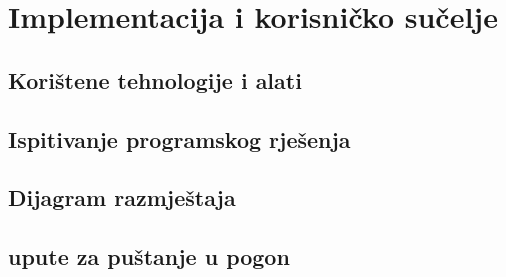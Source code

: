 \chapter{Implementacija i korisničko sučelje}

\section{Korištene tehnologije i alati}
\section{Ispitivanje programskog rješenja}
\section{Dijagram razmještaja}
\section{upute za puštanje u pogon}

\eject